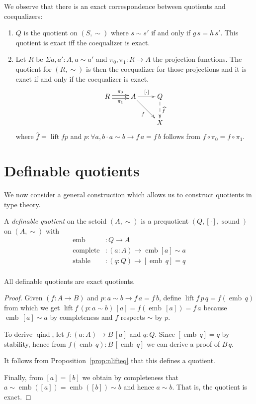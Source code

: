 \documentclass[envcountsame]{llncs}
\providecommand{\class}[1]{[#1]}
\providecommand{\dlift}[1]{\widehat{#1}}
\DeclareMathOperator{\sound}{sound}
\DeclareMathOperator{\qind}{qind}
\DeclareMathOperator{\emb}{emb}
\DeclareMathOperator{\complete}{complete}
\DeclareMathOperator{\stable}{stable}
\DeclareMathOperator{\lift}{lift}
\renewcommand{\equiv}{=}
\begin{document}
We observe that there is an exact correspondence between quotients and coequalizers:
\begin{proposition}\hfill
\begin{enumerate}
\item $Q$ is the quotient on $(S,\sim)$ where $s\sim s'$ if and only if $g\,s=h\,s'$.
This quotient is exact if{f} the coequalizer is exact.
\item Let $R$ be $\Sigma a,a':A,a\sim a'$ and $\pi_0,\pi_1 : R\to A$ the projection functions. The quotient for $(R,\sim)$ is then the coequalizer for those projections and it is exact if and only if the coequalizer is exact.
\[\xymatrix{
R\ar@<0.5ex>[r]^{\pi_0}\ar@<-0.5ex>[r]_{\pi_1}& A\ar[r]^{\class\cdot}\ar[dr]_{f} & Q\ar@{-->}[d]^{\dlift f}\\
&&X
}\]
where $\dlift f=\lift f p$ and $p \colon \forall a,b\cdot a\sim b \to f\,a \equiv f\,b$ follows from $f \circ \pi_0 = f \circ \pi_1$.
\end{enumerate}
\end{proposition}

\section{Definable quotients\\ }\label{sec:defquotients}

We now consider a general construction which allows us to construct quotients in type theory.

\begin{definition}\label{def:defquotients}
A \emph{definable quotient} on the setoid $(A,\sim)$ is a prequotient $(Q,\class\cdot,\sound)$ on $(A,\sim)$ with
\begin{align*}
\emb &: Q \to A\\
\complete &: (a : A) \to \emb {\class a} \sim a\\
\stable &: (q:Q) \to \class{\emb\,q} \equiv q\\
\end{align*}
\end{definition}

\begin{proposition}
All definable quotients are exact quotients.
\end{proposition}
\begin{proof}

Given $(f\colon A \to B)$ and $p : a\sim b \to f\,a \equiv f\,b$, define $\lift f\, p \,q = f (\emb\,q)$ from which we get $\lift f \,(p : a \sim b)\,\class a\equiv f(\emb\,\class a)\equiv f\,a$ because $\emb\,\class a\sim a$ by completeness and $f$ respects $\sim$ by $p$. 

To derive $\qind$, let $f:(a\colon A)\to B\,\class a$ and $q:Q$. Since $ \class{\emb\,q} \equiv q$ by stability, hence from $f (\emb\,q):B\,\class{\emb\,q}$ we can derive a proof of $B\,q$. 

It follows from Proposition~\ref{prop:nlifteq} that this defines a quotient. 

Finally, from $\class a \equiv \class b$ 
we obtain by completeness that $a\sim\emb(\class a)\equiv\emb(\class b)\sim b$ and hence $a\sim b$. That is, the quotient is exact.
\end{proof}
\end{document}
